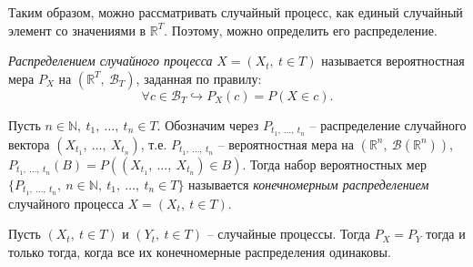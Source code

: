 \begin{note}
Таким образом, можно рассматривать случайный процесс, как единый случайный элемент со значениями в $\displaystyle \mathbb{R}^{T}$. Поэтому, можно определить его распределение.
\end{note}
\begin{definition}
\textit{Распределением случайного процесса }$\displaystyle X=( X_{t} ,\ t\in T)$ называется вероятностная мера $\displaystyle P_{X}$ на $\displaystyle \left(\mathbb{R}^{T} ,\ \mathcal{B}_{T}\right)$, заданная по правилу:
\begin{equation*}
\forall c\in \mathcal{B}_{T} \hookrightarrow P_{X}( c) =P( X\in c) .
\end{equation*}
\end{definition}
\begin{definition}
Пусть $\displaystyle n\in \mathbb{N} ,\ t_{1} ,\ \dotsc ,\ t_{n} \in T$. Обозначим через $\displaystyle P_{t_{1} ,\ \dotsc ,\ t_{n}}$ -- распределение случайного вектора $\displaystyle ( X_{t_{1}} ,\ \dotsc ,\ X_{t_{n}})$, т.е. $\displaystyle P_{t_{1} ,\ \dotsc ,\ t_{n}}$ -- вероятностная мера на $\displaystyle \left(\mathbb{R}^{n} ,\ \mathcal{B}\left(\mathbb{R}^{n}\right)\right)$, $\displaystyle P_{t_{1} ,\ \dotsc ,\ t_{n}}( B) =P(( X_{t_{1}} ,\ \dotsc ,\ X_{t_{n}}) \in B)$. Тогда набор вероятностных мер $\displaystyle \{P_{t_{1} ,\ \dotsc ,\ t_{n}} ,\ n\in \mathbb{N} ,\ t_{1} ,\ \dotsc ,\ t_{n} \in T\}$ называется \textit{конечномерным распределением} случайного процесса $\displaystyle X=( X_{t} ,\ t\in T)$.
\end{definition}
\begin{lemma}
Пусть $\displaystyle ( X_{t} ,\ t\in T)$ и $\displaystyle ( Y_{t} ,\ t\in T)$ -- случайные процессы. Тогда $\displaystyle P_{X} =P_{Y}$ тогда и только тогда, когда все их конечномерные распределения одинаковы.
\end{lemma}
